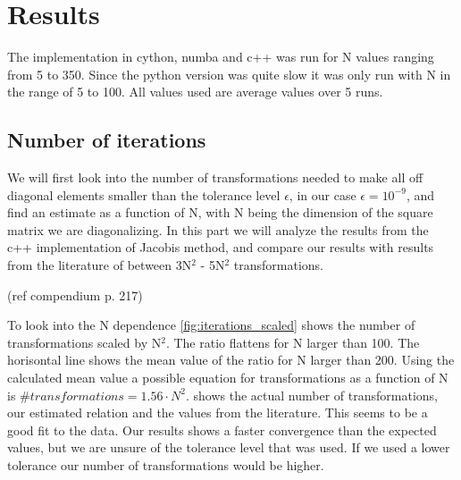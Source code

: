 \section{Results}

The implementation in cython, numba and c++ was run for N values ranging from 5
to 350. Since the python version was quite slow it was only run with N in the
range of 5 to 100. All values used are average values over 5 runs.


\subsection{Number of iterations}

We will first look into the number of transformations needed to make all off
diagonal elements smaller than the tolerance level $\epsilon$, in our case
$\epsilon = 10^{-9}$, and find an estimate as a function of N, with N being the
dimension of the square matrix we are diagonalizing. In this part we will
analyze the results from the c++ implementation of Jacobis method, and compare
our results with results from the literature of between 3N$^2$ - 5N$^2$
transformations.

(ref compendium p. 217)

To look into the N dependence \cref{fig:iterations_scaled} shows the number of
transformations scaled by N$^2$. The ratio flattens for N larger than 100. The
horisontal line shows the mean value of the ratio for N larger than 200. Using
the calculated mean value a possible equation for transformations as a function
of N is $\#transformations = 1.56\cdot N^2$.  shows the
actual number of transformations, our estimated relation and the values from the literature.
This seems to be a
good fit to the data. Our results shows a faster convergence than the expected
values, but we are unsure of the tolerance level that was used. If we used a
lower tolerance our number of transformations would be higher.


